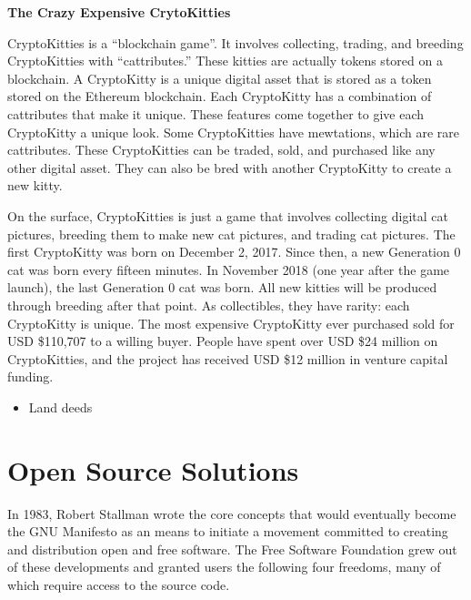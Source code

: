 \documentclass[]{book}
\providecommand{\tightlist}{%
  \setlength{\itemsep}{0pt}\setlength{\parskip}{0pt}}
\let\BeginKnitrBlock\begin \let\EndKnitrBlock\end
\begin{document}
\BeginKnitrBlock{rmdextra}
\textbf{The Crazy Expensive CrytoKitties}

CryptoKitties is a ``blockchain game''. It involves collecting, trading, and breeding CryptoKitties with ``cattributes.'' These kitties are actually tokens stored on a blockchain. A CryptoKitty is a unique digital asset that is stored as a token stored on the Ethereum blockchain.\citep{TCT2018} Each CryptoKitty has a combination of cattributes that make it unique. These features come together to give each CryptoKitty a unique look. Some CryptoKitties have mewtations, which are rare cattributes. These CryptoKitties can be traded, sold, and purchased like any other digital asset. They can also be bred with another CryptoKitty to create a new kitty.

On the surface, CryptoKitties is just a game that involves collecting digital cat pictures, breeding them to make new cat pictures, and trading cat pictures. The first CryptoKitty was born on December 2, 2017. Since then, a new Generation 0 cat was born every fifteen minutes. In November 2018 (one year after the game launch), the last Generation 0 cat was born. All new kitties will be produced through breeding after that point. As collectibles, they have rarity: each CryptoKitty is unique. The most expensive CryptoKitty ever purchased sold for USD \$110,707 to a willing buyer. People have spent over USD \$24 million on CryptoKitties, and the project has received USD \$12 million in venture capital funding. \citep{Hoffman2018}
\EndKnitrBlock{rmdextra}

\begin{itemize}
\tightlist
\item
  Land deeds
\end{itemize}

\hypertarget{open-source-solutions}{%
\section{Open Source Solutions}\label{open-source-solutions}}

In 1983, Robert Stallman wrote the core concepts that would eventually become the GNU Manifesto as an means to initiate a movement committed to creating and distribution open and free software. \citep{Stallman1985} The Free Software Foundation grew out of these developments and granted users the following four freedoms, many of which require access to the source code.
\end{document}
